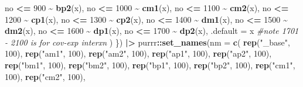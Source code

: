 \documentclass[12pt, twoside]{amherstthesis}
\newenvironment{Shaded}{\begin{snugshade}}{\end{snugshade}}
\newcommand{\AttributeTok}[1]{\textcolor[rgb]{0.13,0.29,0.53}{#1}}
\newcommand{\CommentTok}[1]{\textcolor[rgb]{0.56,0.35,0.01}{\textit{#1}}}
\newcommand{\DecValTok}[1]{\textcolor[rgb]{0.00,0.00,0.81}{#1}}
\newcommand{\FunctionTok}[1]{\textcolor[rgb]{0.13,0.29,0.53}{\textbf{#1}}}
\newcommand{\NormalTok}[1]{#1}
\newcommand{\SpecialCharTok}[1]{\textcolor[rgb]{0.81,0.36,0.00}{\textbf{#1}}}
\newcommand{\StringTok}[1]{\textcolor[rgb]{0.31,0.60,0.02}{#1}}
\begin{document}
\begin{Shaded}
\begin{Highlighting}[]
\NormalTok{        no }\SpecialCharTok{\textless{}=} \DecValTok{900} \SpecialCharTok{\textasciitilde{}} \FunctionTok{bp2}\NormalTok{(x), }
\NormalTok{        no }\SpecialCharTok{\textless{}=} \DecValTok{1000} \SpecialCharTok{\textasciitilde{}} \FunctionTok{cm1}\NormalTok{(x), }
\NormalTok{        no }\SpecialCharTok{\textless{}=} \DecValTok{1100} \SpecialCharTok{\textasciitilde{}} \FunctionTok{cm2}\NormalTok{(x), }
\NormalTok{        no }\SpecialCharTok{\textless{}=} \DecValTok{1200} \SpecialCharTok{\textasciitilde{}} \FunctionTok{cp1}\NormalTok{(x), }
\NormalTok{        no }\SpecialCharTok{\textless{}=} \DecValTok{1300} \SpecialCharTok{\textasciitilde{}} \FunctionTok{cp2}\NormalTok{(x), }
\NormalTok{        no }\SpecialCharTok{\textless{}=} \DecValTok{1400} \SpecialCharTok{\textasciitilde{}} \FunctionTok{dm1}\NormalTok{(x), }
\NormalTok{        no }\SpecialCharTok{\textless{}=} \DecValTok{1500} \SpecialCharTok{\textasciitilde{}} \FunctionTok{dm2}\NormalTok{(x), }
\NormalTok{        no }\SpecialCharTok{\textless{}=} \DecValTok{1600} \SpecialCharTok{\textasciitilde{}} \FunctionTok{dp1}\NormalTok{(x), }
\NormalTok{        no }\SpecialCharTok{\textless{}=} \DecValTok{1700} \SpecialCharTok{\textasciitilde{}} \FunctionTok{dp2}\NormalTok{(x), }
        \AttributeTok{.default =}\NormalTok{ x }\CommentTok{\#note 1701 {-} 2100 is for cov{-}exp interxn}
\NormalTok{      ) }
\NormalTok{    \}) }\SpecialCharTok{|\textgreater{}} 
\NormalTok{    purrr}\SpecialCharTok{::}\FunctionTok{set\_names}\NormalTok{(}\AttributeTok{nm =} \FunctionTok{c}\NormalTok{(}
      \FunctionTok{rep}\NormalTok{(}\StringTok{"\_base"}\NormalTok{, }\DecValTok{100}\NormalTok{), }
      \FunctionTok{rep}\NormalTok{(}\StringTok{"am1"}\NormalTok{, }\DecValTok{100}\NormalTok{), }
      \FunctionTok{rep}\NormalTok{(}\StringTok{"am2"}\NormalTok{, }\DecValTok{100}\NormalTok{), }
      \FunctionTok{rep}\NormalTok{(}\StringTok{"ap1"}\NormalTok{, }\DecValTok{100}\NormalTok{), }
      \FunctionTok{rep}\NormalTok{(}\StringTok{"ap2"}\NormalTok{, }\DecValTok{100}\NormalTok{), }
      \FunctionTok{rep}\NormalTok{(}\StringTok{"bm1"}\NormalTok{, }\DecValTok{100}\NormalTok{), }
      \FunctionTok{rep}\NormalTok{(}\StringTok{"bm2"}\NormalTok{, }\DecValTok{100}\NormalTok{), }
      \FunctionTok{rep}\NormalTok{(}\StringTok{"bp1"}\NormalTok{, }\DecValTok{100}\NormalTok{), }
      \FunctionTok{rep}\NormalTok{(}\StringTok{"bp2"}\NormalTok{, }\DecValTok{100}\NormalTok{), }
      \FunctionTok{rep}\NormalTok{(}\StringTok{"cm1"}\NormalTok{, }\DecValTok{100}\NormalTok{), }
      \FunctionTok{rep}\NormalTok{(}\StringTok{"cm2"}\NormalTok{, }\DecValTok{100}\NormalTok{), }

\end{Highlighting}
\end{Shaded}
\end{document}
